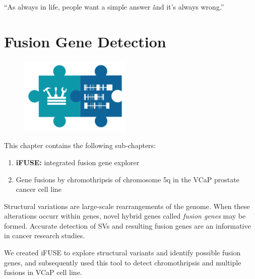 \begin{savequote}[75mm]
“As always in life, people want a simple answer \. \. \. and it’s always wrong.”
\end{savequote}

\chapter{Fusion Gene Detection}\label{chapter:fusiongenes}
\setcounter{figure}{-1}
\setcounter{table}{-1}
\setcounter{section}{-1}

\begin{figure}[t!]
\includegraphics[height=10em]{frontmatter/images/chapter-header-fusion-tools.png}
\end{figure}
\setcounter{figure}{-1}
\setcounter{table}{-1}
\setcounter{section}{-1}

This chapter contains the following sub-chapters:

\begin{enumerate}[label=\ref{chapter:fusiongenes}.\arabic*]
\itemsep-0.5em
\item \textbf{iFUSE:} integrated fusion gene explorer
\item Gene fusions by chromothripsis of chromosome 5q in the VCaP prostate cancer cell line
\end{enumerate}


Structural variations are large-scale rearrangements of the genome. When these alterations occurr within genes, novel hybrid genes called \emph{fusion genes} may be formed. Accurate detection of SVs and resulting fusion genes are an informative in cancer research studies.

We created iFUSE to explore structural variants and identify possible fusion genes, and subsequently used this tool to detect chromothripsis and multiple fusions in VCaP cell line.


